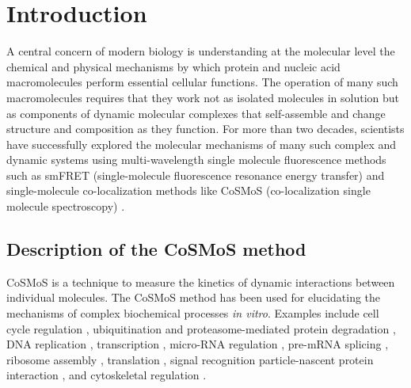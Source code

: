 \section{Introduction}

A central concern of modern biology is understanding at the molecular level the chemical and physical mechanisms by which protein and nucleic acid macromolecules  perform essential cellular functions.  The operation of many such macromolecules requires that they work not as isolated molecules in solution but as components of dynamic molecular complexes that self-assemble and change structure and composition as they function.  For more than  two decades, scientists have successfully explored the molecular mechanisms of many such complex and dynamic systems using multi-wavelength single molecule fluorescence methods such as smFRET (single-molecule fluorescence resonance energy transfer) \cite{Roy2008-fo} and single-molecule co-localization methods like CoSMoS (co-localization single molecule spectroscopy) \cite{Larson2014-os, Van_Oijen2011-ig}.

\subsection{Description of the CoSMoS method}
CoSMoS is a technique to measure the kinetics of dynamic interactions between individual molecules.  The CoSMoS method has been used for elucidating the mechanisms of complex biochemical processes \textit{in vitro}. Examples include cell cycle regulation \cite{Lu2015-eu}, ubiquitination and proteasome-mediated protein degradation \cite{Lu2015-jq}, DNA replication \cite{Geertsema2014-bt,Ticau2015-ib}, transcription \cite{Zhang2012-no,Friedman2012-if,Friedman2013-sf}, micro-RNA regulation \cite{Salomon2015-kq}, pre-mRNA splicing \cite{Shcherbakova2013-bi, Krishnan2013-fy, Warnasooriya2014-ls}, ribosome assembly \cite{Kim2014-zc}, translation \cite{Wang2015-tt,Tsai2014-mi,OLeary2013-wo}, signal recognition particle-nascent protein interaction \cite{Noriega2014-vj}, and cytoskeletal regulation \cite{Smith2013-qj,Breitsprecher2012-mj}. 

